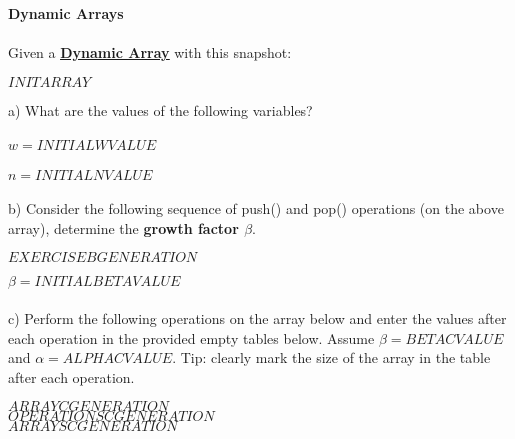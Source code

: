 \textbf{\LARGE{\color{tumgadRed}Dynamic Arrays}}\\
\\
\noindent
Given a \href{https://sebastianoner.github.io/TUMGAD/src/DataStructures/Sequences/Arrays/Arrays}{\textbf{\underline{Dynamic Array}}} with this snapshot:
\begin{center}
    $INITARRAY$
\end{center}
a) What are the values of the following variables?\\
\\
\color{tumgadRed}
$w = INITIALWVALUE$\\
\\
$n = INITIALNVALUE$\\
\\
\color{black}
b) Consider the following sequence of push() and pop() operations (on the above array), determine the \textbf{growth factor $\beta$}.
\begin{center}
    $EXERCISEBGENERATION$
\end{center}
\color{tumgadRed}
$\beta = INITIALBETAVALUE$\\
\color{black}
\\
c) Perform the following operations on the array below and enter the values after each operation in the provided empty
tables below. Assume $\beta = BETACVALUE$ and $\alpha = ALPHACVALUE$. Tip: clearly mark the size of the array in the table after each operation.
\begin{center}
    $ARRAYCGENERATION$\\
    \color{tumgadRed}
    $OPERATIONSCGENERATION$\\
    $ARRAYSCGENERATION$
    \color{black}
\end{center}
